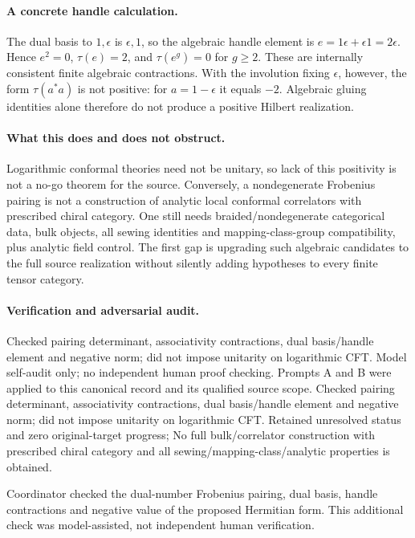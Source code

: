 \documentclass[11pt]{article}
\begin{document}
\paragraph{A concrete handle calculation.} The dual basis to $1,\epsilon$ is $\epsilon,1$, so the algebraic handle element is $e=1\epsilon+\epsilon1=2\epsilon$. Hence $e^2=0$, $\tau(e)=2$, and $\tau(e^g)=0$ for $g\geq2$. These are internally consistent finite algebraic contractions. With the involution fixing $\epsilon$, however, the form $\tau(a^*a)$ is not positive: for $a=1-\epsilon$ it equals $-2$. Algebraic gluing identities alone therefore do not produce a positive Hilbert realization.

\paragraph{What this does and does not obstruct.} Logarithmic conformal theories need not be unitary, so lack of this positivity is not a no-go theorem for the source. Conversely, a nondegenerate Frobenius pairing is not a construction of analytic local conformal correlators with prescribed chiral category. One still needs braided/nondegenerate categorical data, bulk objects, all sewing identities and mapping-class-group compatibility, plus analytic field control. The first gap is upgrading such algebraic candidates to the full source realization without silently adding hypotheses to every finite tensor category.

\paragraph{Verification and adversarial audit.}
Checked pairing determinant, associativity contractions, dual basis/handle element and negative norm; did not impose unitarity on logarithmic CFT. Model self-audit only; no independent human proof checking. Prompts A and B were applied to this canonical record and its qualified source scope. Checked pairing determinant, associativity contractions, dual basis/handle element and negative norm; did not impose unitarity on logarithmic CFT. Retained unresolved status and zero original-target progress; No full bulk/correlator construction with prescribed chiral category and all sewing/mapping-class/analytic properties is obtained.

Coordinator checked the dual-number Frobenius pairing, dual basis, handle contractions and negative value of the proposed Hermitian form. This additional check was model-assisted, not independent human verification.
\end{document}
